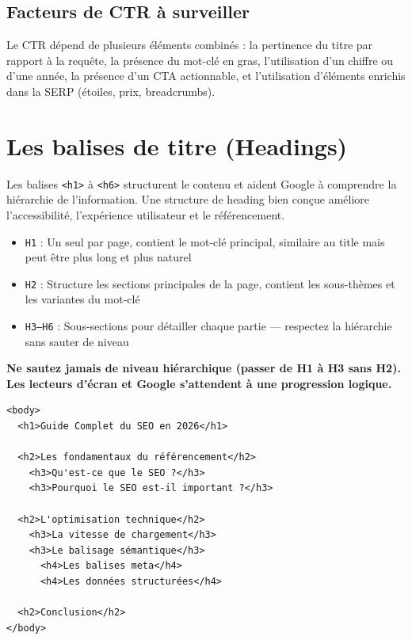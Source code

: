 \documentclass[12pt,a4paper,twoside]{report}
\newcommand{\important}[1]{\textbf{\textcolor{googlered}{#1}}}
\begin{document}
\subsection{Facteurs de CTR à surveiller}

Le CTR dépend de plusieurs éléments combinés : la pertinence du titre par rapport à la requête, la présence du mot-clé en gras, l'utilisation d'un chiffre ou d'une année, la présence d'un CTA actionnable, et l'utilisation d'éléments enrichis dans la SERP (étoiles, prix, breadcrumbs).

\section{Les balises de titre (Headings)}

Les balises \texttt{<h1>} à \texttt{<h6>} structurent le contenu et aident Google à comprendre la hiérarchie de l'information. Une structure de heading bien conçue améliore l'accessibilité, l'expérience utilisateur et le référencement.

\begin{itemize}
    \item \texttt{H1} : Un seul par page, contient le mot-clé principal, similaire au title mais peut être plus long et plus naturel
    \item \texttt{H2} : Structure les sections principales de la page, contient les sous-thèmes et les variantes du mot-clé
    \item \texttt{H3--H6} : Sous-sections pour détailler chaque partie --- respectez la hiérarchie sans sauter de niveau
\end{itemize}

\important{Ne sautez jamais de niveau hiérarchique (passer de H1 à H3 sans H2). Les lecteurs d'écran et Google s'attendent à une progression logique.}

\begin{lstlisting}[style=htmlcode,caption={Structure hiérarchique de headings recommandée}]
<body>
  <h1>Guide Complet du SEO en 2026</h1>

  <h2>Les fondamentaux du référencement</h2>
    <h3>Qu'est-ce que le SEO ?</h3>
    <h3>Pourquoi le SEO est-il important ?</h3>

  <h2>L'optimisation technique</h2>
    <h3>La vitesse de chargement</h3>
    <h3>Le balisage sémantique</h3>
      <h4>Les balises meta</h4>
      <h4>Les données structurées</h4>

  <h2>Conclusion</h2>
</body>
\end{lstlisting}
\end{document}
